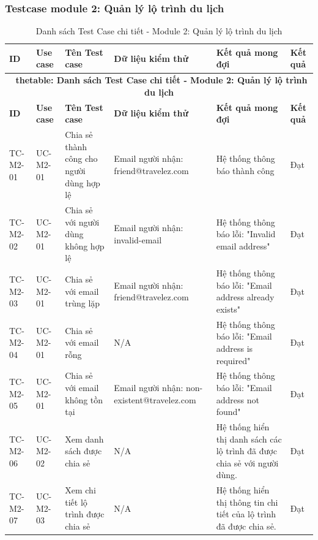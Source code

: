 \subsubsection{Testcase module 2: Quản lý lộ trình du lịch}

\hypertarget{target:tc_m2}{}
\begin{landscape}
\small 
\begin{longtable}{|p{2.2cm}|p{2.2cm}|p{4cm}|p{4.5cm}|p{6cm}|p{2cm}|}
    
\caption{Danh sách Test Case chi tiết - Module 2: Quản lý lộ trình du lịch} \label{tab:tc_module2} \\
\hline
\textbf{ID} & \textbf{ Use case} & \textbf{Tên Test case} & \textbf{Dữ liệu kiểm thử} & \textbf{Kết quả mong đợi} & \textbf{Kết quả } \\
\hline
\endfirsthead

\multicolumn{6}{c}{{\bfseries \tablename\ thetable{}: Danh sách Test Case chi tiết - Module 2: Quản lý lộ trình du lịch}} \\
\hline
\textbf{ID} & \textbf{ Use case} & \textbf{Tên Test case} & \textbf{Dữ liệu kiểm thử} & \textbf{Kết quả mong đợi} & \textbf{Kết quả } \\
\hline
\endhead

\hline
\endlastfoot


TC-M2-01 & UC-M2-01 & Chia sẻ thành công cho người dùng hợp lệ & 
Email người nhận: friend@travelez.com  & 
Hệ thống thông báo thành công & Đạt\\
\hline

TC-M2-02 & UC-M2-01 & Chia sẻ với người dùng không hợp lệ & 
Email người nhận: invalid-email & 
Hệ thống thông báo lỗi: "Invalid email address" & Đạt \\
\hline

TC-M2-03 & UC-M2-01 & Chia sẻ với email trùng lặp & 
Email người nhận: friend@travelez.com  & 
Hệ thống thông báo lỗi: "Email address already exists" & Đạt\\
\hline

TC-M2-04 & UC-M2-01 & Chia sẻ với email rỗng & 
N/A & 
Hệ thống thông báo lỗi: "Email address is required" & Đạt \\
\hline

TC-M2-05 & UC-M2-01 & Chia sẻ với email không tồn tại & 
Email người nhận: non-existent@travelez.com  & 
Hệ thống thông báo lỗi: "Email address not found" & Đạt \\
\hline

TC-M2-06 & UC-M2-02 & Xem danh sách được chia sẻ & 
N/A & 
Hệ thống hiển thị danh sách các lộ trình đã được chia sẻ với người dùng. & Đạt \\
\hline

TC-M2-07 & UC-M2-03 & Xem chi tiết lộ trình được chia sẻ & 
N/A & 
Hệ thống hiển thị thông tin chi tiết của lộ trình đã được chia sẻ. & Đạt \\
\hline


\end{longtable}
\end{landscape}
